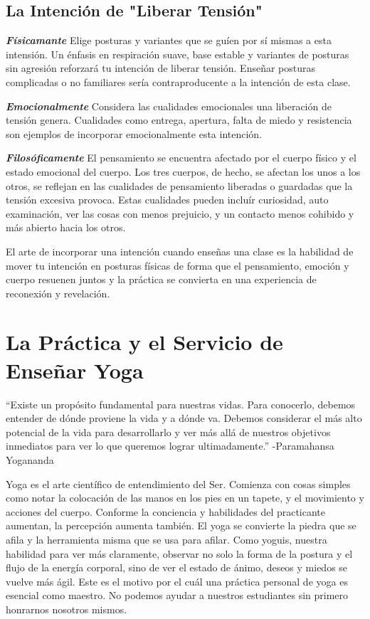\subsection{La Intención de "Liberar Tensión"}
\textbf{\textit{Físicamante}}
Elige posturas y variantes que se guíen por sí mismas a esta intensión. Un \'enfasis en respiración suave, base estable y variantes de posturas sin agresión reforzará tu intención de liberar tensión. Enseñar posturas complicadas o no familiares sería contraproducente a la intención de esta clase.

\textbf{\textit{Emocionalmente}}
Considera las cualidades emocionales una liberación de tensión genera. Cualidades como entrega, apertura, falta de miedo y resistencia son ejemplos de incorporar emocionalmente esta intención.

\textbf{\textit{Filosóficamente}}
El pensamiento se encuentra afectado por el cuerpo físico y el estado emocional del cuerpo. Los tres cuerpos, de hecho, se afectan los unos a los otros, se reflejan en las cualidades de pensamiento liberadas o guardadas que la tensión excesiva provoca. Estas cualidades pueden incluír curiosidad, auto examinación, ver las cosas con menos prejuicio, y un contacto menos cohibido y más abierto hacia los otros.

El arte de incorporar una intención cuando enseñas una clase es la habilidad de mover tu intención en posturas físicas de forma que el pensamiento, emoción y cuerpo resuenen juntos y la práctica se convierta en una experiencia de reconexión y revelación.

\section{La Práctica y el Servicio de Enseñar Yoga}
``Existe un propósito fundamental para nuestras vidas. Para conocerlo, debemos entender de dónde proviene la vida y a dónde va. Debemos considerar el más alto potencial de la vida para desarrollarlo y ver más allá de nuestros objetivos inmediatos para ver lo que queremos lograr ultimadamente.''
-Paramahansa Yogananda

Yoga es el arte científico de entendimiento del Ser. Comienza con cosas simples como notar la colocación de las manos en los pies en un tapete, y el movimiento y acciones del cuerpo. Conforme la conciencia y habilidades del practicante aumentan, la percepción aumenta tambi\'en. El yoga se convierte la piedra que se afila y la herramienta misma que se usa para afilar. Como yoguis, nuestra habilidad para ver más claramente, observar no solo la forma de la postura y el flujo de la energía corporal, sino de ver el estado de ánimo, deseos y miedos se vuelve más ágil. Este es el motivo por el cuál una práctica personal de yoga es esencial como maestro. No podemos ayudar a nuestros estudiantes sin primero honrarnos nosotros mismos.

